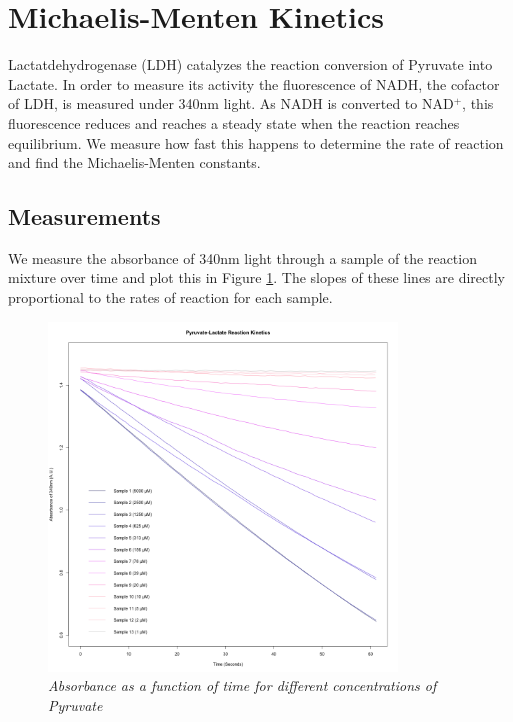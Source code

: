 \documentclass[a4paper,10pt]{article}
\begin{document}
    \section{Michaelis-Menten Kinetics}
        Lactatdehydrogenase (LDH) catalyzes the reaction conversion of Pyruvate into Lactate. 
        In order to measure its activity the fluorescence of NADH, the cofactor of LDH, is measured 
        under 340nm light. As NADH is converted to NAD$^+$, this fluorescence reduces and reaches a 
        steady state when the reaction reaches equilibrium. We measure how fast this happens to determine
        the rate of reaction and find the Michaelis-Menten constants.
        
        \subsection*{Measurements}
            We measure the absorbance of 340nm light through a sample of the reaction mixture over time
            and plot this in Figure \ref{fig:mm_rates}. The slopes of these lines are directly proportional
            to the rates of reaction for each sample.
            \begin{figure}[H]
                \centering
                \includegraphics[width=350px]{../resources/kinetics_rates.png}
                \caption{\it Absorbance  as a function of time for different concentrations of Pyruvate}\label{fig:mm_rates}
            \end{figure}
            
\end{document}
